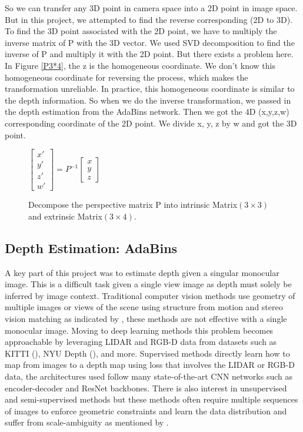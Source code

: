 \documentclass{article}
\begin{document}
So we can transfer any 3D point in camera space into a 2D point in image space. But in this project, we attempted to find the reverse corresponding (2D to 3D). To find the 3D point associated with the 2D point, we have to multiply the inverse matrix of P with the 3D vector. We used SVD decomposition to find the inverse of P and multiply it with the 2D point. But there exists a problem here. In Figure \ref{P3*4}, the z is the homogeneous coordinate. We don't know this homogeneous coordinate for reversing the process, which makes the transformation unreliable. In practice, this homogeneous coordinate is similar to the depth information. So when we do the inverse transformation, we passed in the depth estimation from the AdaBins network. Then we got the 4D (x,y,z,w) corresponding coordinate of the 2D point. We divide x, y, z by w and got the 3D point.

\begin{figure}[ht]
\centering
$\begin{bmatrix}x'
\\ y'
\\ z'
\\ w'

\end{bmatrix}=P^{-1}
\begin{bmatrix}x
\\ y
\\ z

\end{bmatrix} $
\caption{Decompose the perspective matrix P into intrinsic Matrix$(3\times3)$ and extrinsic Matrix$(3\times4)$.}
\end{figure}

\subsection{Depth Estimation: AdaBins}
A key part of this project was to estimate depth given a singular monocular image.
This is a difficult task given a single view image as depth must solely be inferred by image context. 
Traditional computer vision methods use geometry of multiple images or views of the scene using structure from motion and stereo vision matching as indicated by \cite{MonocularDepthEstimationSurvey}, these methods are not effective with a single monocular image.
Moving to deep learning methods this problem becomes approachable by leveraging LIDAR and RGB-D data from datasets such as KITTI (\cite{KITTI_raw_dataset}), NYU Depth (\cite{NYUDepth}), and more.
Supervised methods directly learn how to map from images to a depth map using loss that involves the LIDAR or RGB-D data, the architectures used follow many state-of-the-art CNN networks such as encoder-decoder and ResNet backbones. 
There is also interest in unsupervised and semi-supervised methods but these methods often require multiple sequences of images to enforce geometric constraints and learn the data distribution and suffer from scale-ambiguity as mentioned by \cite{MonocularDepthEstimationSurvey}.
\end{document}
